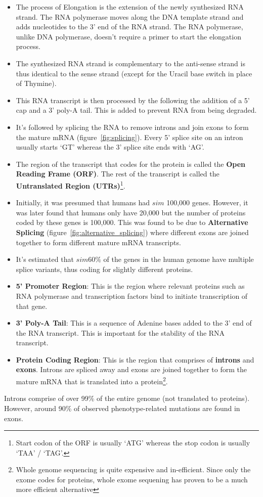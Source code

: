 \documentclass[letterpaper,12pt]{article}
\begin{document}
\begin{itemize}
	\item The process of Elongation is the extension of the newly synthesized RNA strand. The RNA polymerase moves along the DNA template strand and adds nucleotides to the 3' end of the RNA strand. The RNA polymerase, unlike DNA polymerase, doesn't require a primer to start the elongation process.
	\item The synthesized RNA strand is complementary to the anti-sense strand is thus identical to the sense strand (except for the Uracil base switch in place of Thymine).
	\item This RNA transcript is then processed by the following the addition of a 5' cap and a 3' poly-A tail. This is added to prevent RNA from being degraded.
	\item It's followed by splicing the RNA to remove introns and join exons to form the mature mRNA (figure~\ref{fig:splicing}). Every 5' splice site on an intron usually starts `GT' whereas the 3' splice site ends with `AG'.
	\item The region of the transcript that codes for the protein is called the \textbf{Open Reading Frame (ORF)}. The rest of the transcript is called the \textbf{Untranslated Region (UTRs)}\footnote{Start codon of the ORF is usually `ATG' whereas the stop codon is usually `TAA' / `TAG'.}.
	\item Initially, it was presumed that humans had $sim$ 100,000 genes. However, it was later found that humans only have 20,000 but the number of proteins coded by these genes is 100,000. This was found to be due to \textbf{Alternative Splicing} (figure~\ref{fig:alternative_splicing}) where different exons are joined together to form different mature mRNA transcripts.
	\item It's estimated that $sim 60\%$ of the genes in the human genome have multiple splice variants, thus coding for slightly different proteins.
\end{itemize}
\begin{itemize}
	\item \textbf{5' Promoter Region}: This is the region where relevant proteins such as RNA polymerase and transcription factors bind to initiate transcription of that gene.
	\item \textbf{3' Poly-A Tail}: This is a sequence of Adenine bases added to the 3' end of the RNA transcript. This is important for the stability of the RNA transcript.
	\item \textbf{Protein Coding Region}: This is the region that comprises of \textbf{introns} and \textbf{exons}. Introns are spliced away and exons are joined together to form the mature mRNA that is translated into a protein\footnote{Whole genome sequencing is quite expensive and in-efficient. Since only the exome codes for proteins, whole exome sequening has proven to be a much more efficient alternative}.
\end{itemize}

Introns comprise of over 99\% of the entire genome (not translated to proteins). However, around 90\% of observed phenotype-related mutations are found in exons.

\newpage


\end{document}
